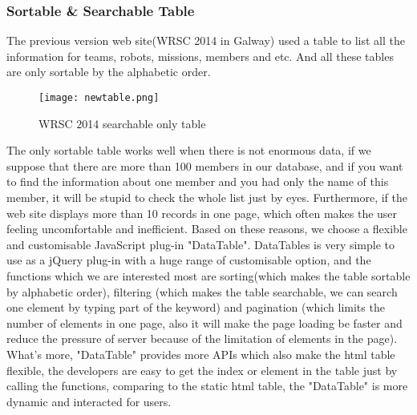 \subsubsection{Sortable \& Searchable Table}

The previous version web site(WRSC 2014 in Galway) used a table to list all the information for teams, robots, missions, members and etc. And all these tables are only sortable by the alphabetic order.
\begin{figure}[h!]
\centering
\texttt{[image: newtable.png]}
\caption{WRSC 2014 searchable only table }
\label{fig-sample}
\end{figure}
The only sortable table works well when there is not enormous data, if we suppose that there are more than 100 members in our database, and if you want to find the information about one member and you had only the name of this member, it will be stupid to check the whole list just by eyes. Furthermore, if the web site displays more than 10 records in one page, which often makes the user feeling uncomfortable and inefficient. Based on these reasons, we choose a flexible and customisable JavaScript plug-in "DataTable". DataTables is very simple to use as a jQuery plug-in with a huge range of customisable option, and the functions which we are interested most are sorting(which makes the table sortable by alphabetic order), filtering (which makes the table searchable, we can search one element by typing part of the keyword) and pagination (which limits the number of elements in one page, also it will make the page loading be faster and reduce the pressure of server because of the limitation of elements in the page). What's more, "DataTable" provides more APIs which also make the html table flexible, the developers are easy to get the index or element in the table just by calling the functions, comparing to the static html table, the "DataTable" is more dynamic and interacted for users.

